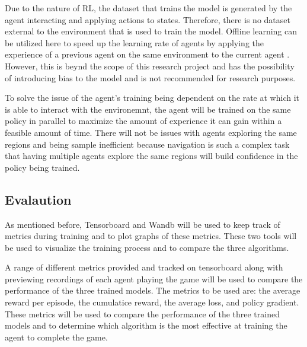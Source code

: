 Due to the nature of RL, the dataset that trains the model is generated by the agent interacting and applying actions to states. Therefore, there is no dataset external to the environment that is used to train the model. Offline learning can be utilized here to speed up the learning rate of agents by applying the experience of a previous agent on the same environment to the current agent \cite{Sutton1}. However, this is beynd the scope of this research project and has the possibility of introducing bias to the model and is not recommended for research purposes.

To solve the issue of the agent's training being dependent on the rate at which it is able to interact with the environemnt, the agent will be trained on the same policy in parallel to maximize the amount of experience it can gain within a feasible amount of time. There will not be issues with agents exploring the same regions and being sample inefficient because navigation is such a complex task that having multiple agents explore the same regions will build confidence in the policy being trained.

\subsection{Evalaution}

As mentioned before, Tensorboard and Wandb will be used to keep track of metrics during training and to plot graphs of these metrics. These two tools will be used to visualize the training process and to compare the three algorithms.

A range of different metrics provided and tracked on tensorboard along with previewing recordings of each agent playing the game will be used to compare the performance of the three trained models. The metrics to be used are: the average reward per episode, the cumulatice reward, the average loss, and policy gradient. These metrics will be used to compare the performance of the three trained models and to determine which algorithm is the most effective at training the agent to complete the game.